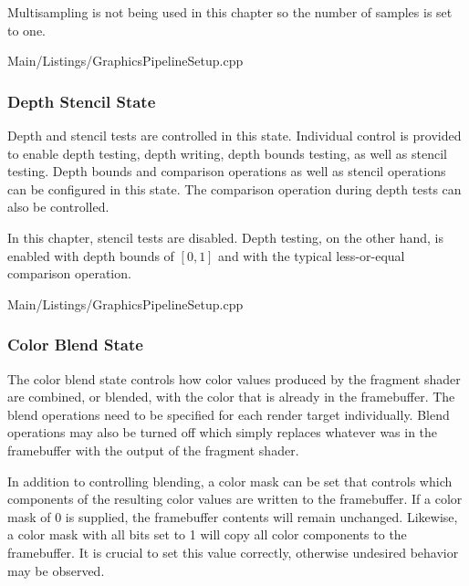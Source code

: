         Multisampling is not being used in this chapter so the number of samples is set to one.

        
        {Main/Listings/GraphicsPipelineSetup.cpp}

      \subsubsection{Depth Stencil State}
        Depth and stencil tests are controlled in this state.
        Individual control is provided to enable depth testing, depth writing, depth bounds testing, as well as stencil testing.
        Depth bounds and comparison operations as well as stencil operations can be configured in this state.
        The comparison operation during depth tests can also be controlled.

        In this chapter, stencil tests are disabled.
        Depth testing, on the other hand, is enabled with depth bounds of $[0, 1]$ and with the typical less-or-equal comparison operation.

        
        {Main/Listings/GraphicsPipelineSetup.cpp}

      \subsubsection{Color Blend State}
        The color blend state controls how color values produced by the fragment shader are combined, or blended, with the color that is already in the framebuffer.
        The blend operations need to be specified for each render target individually.
        Blend operations may also be turned off which simply replaces whatever was in the framebuffer with the output of the fragment shader.

        In addition to controlling blending, a color mask can be set that controls which components of the resulting color values are written to the framebuffer.
        If a color mask of 0 is supplied, the framebuffer contents will remain unchanged.
        Likewise, a color mask with all bits set to 1 will copy all color components to the framebuffer.
        It is crucial to set this value correctly, otherwise undesired behavior may be observed.

